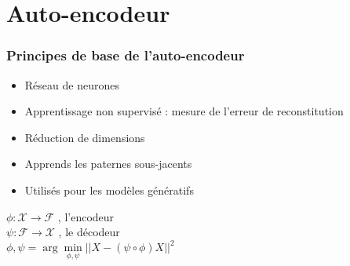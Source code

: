 \documentclass{beamer}
\begin{document}
\section{Auto-encodeur}
\begin{frame}
\frametitle{Principes de base de l'auto-encodeur}
\begin{itemize}
    \item Réseau de neurones
    \item Apprentissage non supervisé : mesure de l'erreur de reconstitution
    \item Réduction de dimensions
    \item Apprends les paternes sous-jacents
    \item Utilisés pour les modèles génératifs
\end{itemize}
\begin{center}
    $ \phi : \mathcal{X} \rightarrow \mathcal{F}$ , l'encodeur \\
    $ \psi : \mathcal{F} \rightarrow \mathcal{X}$ , le décodeur \\
    $ \phi,\psi = \arg \min\limits_{\phi,\psi} || X-(\psi \circ \phi)X||^2$
\end{center}

\end{frame}

\end{document}

